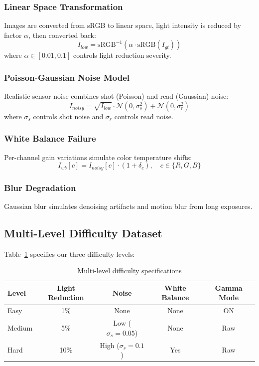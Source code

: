 \documentclass[12pt,a4paper]{article}
\begin{document}
\subsubsection{Linear Space Transformation}

Images are converted from sRGB to linear space, light intensity is reduced by factor $\alpha$, then converted back:
\begin{equation}
I_{low} = \text{sRGB}^{-1}(\alpha \cdot \text{sRGB}(I_{gt}))
\end{equation}
where $\alpha \in [0.01, 0.1]$ controls light reduction severity.

\subsubsection{Poisson-Gaussian Noise Model}

Realistic sensor noise combines shot (Poisson) and read (Gaussian) noise:
\begin{equation}
I_{noisy} = \sqrt{I_{low}} \cdot \mathcal{N}(0, \sigma_s^2) + \mathcal{N}(0, \sigma_r^2)
\end{equation}
where $\sigma_s$ controls shot noise and $\sigma_r$ controls read noise.

\subsubsection{White Balance Failure}

Per-channel gain variations simulate color temperature shifts:
\begin{equation}
I_{wb}[c] = I_{noisy}[c] \cdot (1 + \delta_c), \quad c \in \{R, G, B\}
\end{equation}

\subsubsection{Blur Degradation}

Gaussian blur simulates denoising artifacts and motion blur from long exposures.

\subsection{Multi-Level Difficulty Dataset}

Table~\ref{tab:difficulty} specifies our three difficulty levels:

\begin{table}[H]
\centering
\caption{Multi-level difficulty specifications}
\label{tab:difficulty}
\begin{tabular}{lcccc}
\toprule
Level & Light Reduction & Noise & White Balance & Gamma Mode \\
\midrule
Easy & 1\% & None & None & ON \\
Medium & 5\% & Low ($\sigma_s=0.05$) & None & Raw \\
Hard & 10\% & High ($\sigma_s=0.1$) & Yes & Raw \\
\bottomrule
\end{tabular}
\end{table}
\end{document}
